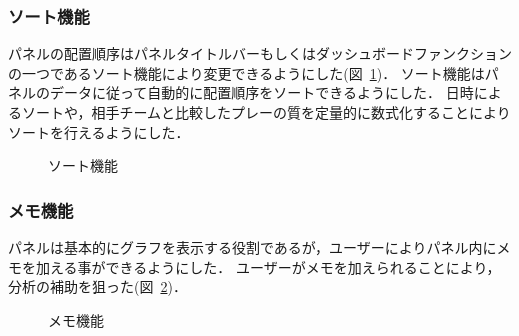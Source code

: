 \documentclass[sotsuron]{kuee}
\begin{document}
			\subsubsection{ソート機能}
				パネルの配置順序はパネルタイトルバーもしくはダッシュボードファンクションの一つであるソート機能により変更できるようにした(図~\ref{fig:sort})．
				ソート機能はパネルのデータに従って自動的に配置順序をソートできるようにした．
				日時によるソートや，相手チームと比較したプレーの質を定量的に数式化することによりソートを行えるようにした．
					\begin{figure}
						\begin{center}
						\end{center}
						\caption{ソート機能}
				  		\label{fig:sort}
					\end{figure}
			\subsubsection{メモ機能}
				パネルは基本的にグラフを表示する役割であるが，ユーザーによりパネル内にメモを加える事ができるようにした．
				ユーザーがメモを加えられることにより，分析の補助を狙った(図~\ref{fig:memo})．
					\begin{figure}
						\begin{center}
						\end{center}
						\caption{メモ機能}
				  		\label{fig:memo}
					\end{figure}
\end{document}
